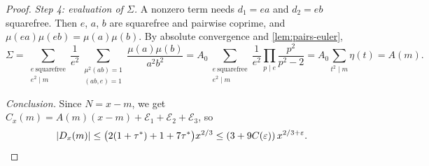 \begin{proof}
\emph{Step 4: evaluation of $\Sigma$.} A nonzero term needs $d_1=ea$ and $d_2=eb$ squarefree. Then $e$, $a$, $b$ are squarefree and pairwise coprime, and $\mu(ea)\mu(eb)=\mu(a)\mu(b)$. By absolute convergence and \cref{lem:pairs-euler},
\[
\Sigma=\sum_{\substack{e\ \mathrm{squarefree}\\ e^2\mid m}}\frac1{e^2}\sum_{\substack{\mu^2(ab)=1\\(ab,e)=1}}\frac{\mu(a)\mu(b)}{a^2b^2}
=A_0\sum_{\substack{e\ \mathrm{squarefree}\\ e^2\mid m}}\frac1{e^2}\prod_{p\mid e}\frac{p^2}{p^2-2}=A_0\sum_{t^2\mid m}\eta(t)=A(m).
\]

\emph{Conclusion.} Since $N=x-m$, we get $C_x(m)=A(m)(x-m)+\mathcal E_1+\mathcal E_2+\mathcal E_3$, so
\[
|D_x(m)|\le\bigl(2(1+\tau^*)+1+7\tau^*\bigr)x^{2/3}\le(3+9C(\varepsilon))\,x^{2/3+\varepsilon}.\qedhere
\]
\end{proof}
